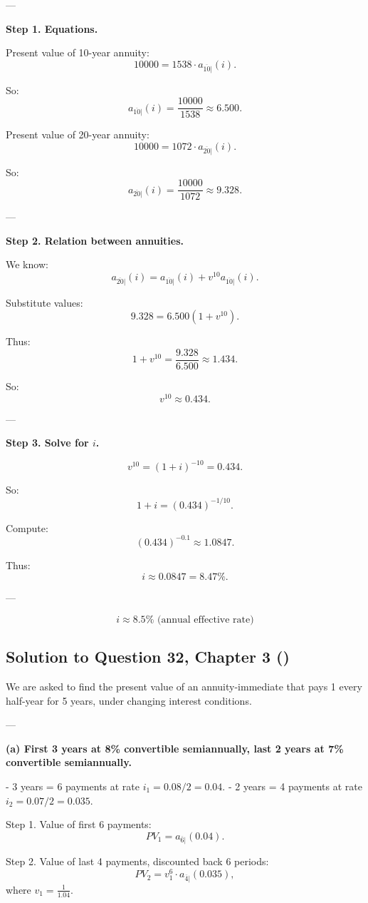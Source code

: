 \documentclass[12pt, a4paper]{article}
\begin{document}
---

\textbf{Step 1. Equations.}

Present value of 10-year annuity:
\[
10000 = 1538 \cdot a_{\overline{10}|}(i).
\]

So:
\[
a_{\overline{10}|}(i) = \frac{10000}{1538} \approx 6.500.
\]

Present value of 20-year annuity:
\[
10000 = 1072 \cdot a_{\overline{20}|}(i).
\]

So:
\[
a_{\overline{20}|}(i) = \frac{10000}{1072} \approx 9.328.
\]

---

\textbf{Step 2. Relation between annuities.}

We know:
\[
a_{\overline{20}|}(i) = a_{\overline{10}|}(i) + v^{10} a_{\overline{10}|}(i).
\]

Substitute values:
\[
9.328 = 6.500(1+v^{10}).
\]

Thus:
\[
1+v^{10} = \frac{9.328}{6.500} \approx 1.434.
\]

So:
\[
v^{10} \approx 0.434.
\]

---

\textbf{Step 3. Solve for $i$.}

\[
v^{10} = (1+i)^{-10} = 0.434.
\]

So:
\[
1+i = (0.434)^{-1/10}.
\]

Compute:
\[
(0.434)^{-0.1} \approx 1.0847.
\]

Thus:
\[
i \approx 0.0847 = 8.47\%.
\]

---

\[
\boxed{i \approx 8.5\% \text{ (annual effective rate)}}
\]

\subsection*{Solution to Question 32, Chapter 3 (\cite{toi3rd})}

We are asked to find the present value of an annuity-immediate that pays 1 every half-year for 5 years, under changing interest conditions.

---

\textbf{(a) First 3 years at 8\% convertible semiannually, last 2 years at 7\% convertible semiannually.}

- 3 years = 6 payments at rate $i_1 = 0.08/2 = 0.04$.  
- 2 years = 4 payments at rate $i_2 = 0.07/2 = 0.035$.  

Step 1. Value of first 6 payments:  
\[
PV_1 = a_{\overline{6}|}(0.04).
\]

Step 2. Value of last 4 payments, discounted back 6 periods:  
\[
PV_2 = v_1^6 \cdot a_{\overline{4}|}(0.035),
\]
where $v_1 = \frac{1}{1.04}$.
\end{document}
